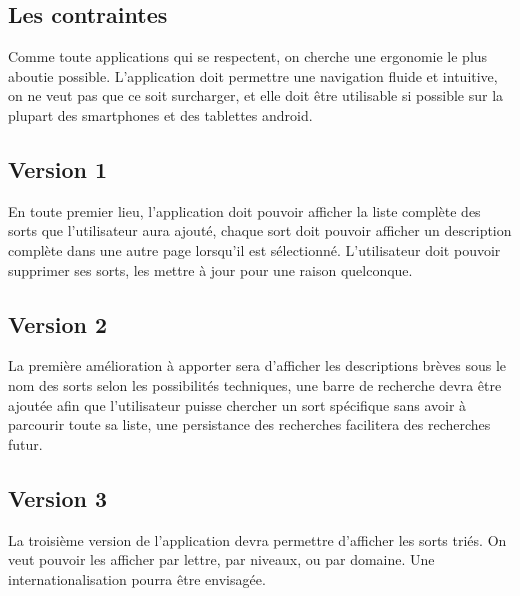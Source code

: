 \documentclass[a4paper, 11pt]{report}
\begin{document}
		\subsection{Les contraintes}
			Comme toute applications qui se respectent, on cherche une ergonomie le plus aboutie possible.
			L'application doit permettre une navigation fluide et intuitive, on ne veut pas que ce soit 
			surcharger, et elle doit être utilisable si possible sur la plupart des smartphones et des 
			tablettes android. 
			\subsection{Version 1}
				En toute premier lieu, l'application doit pouvoir afficher la liste complète des sorts
				que l'utilisateur aura ajouté, chaque sort doit pouvoir afficher un description complète
				dans une autre page lorsqu'il est sélectionné. L'utilisateur doit pouvoir supprimer ses 
				sorts, les mettre à jour pour une raison quelconque.  
			\subsection{Version 2}
				La première amélioration à apporter sera d'afficher les descriptions brèves sous le nom des 
				sorts selon les possibilités techniques, une barre de recherche devra être ajoutée afin 
				que l'utilisateur puisse chercher un sort spécifique sans avoir à parcourir toute sa liste,
				une persistance des recherches facilitera des recherches futur.
			\subsection{Version 3} 
				La troisième version de l'application devra permettre d'afficher les sorts triés.
				On veut pouvoir les afficher par lettre, par niveaux, ou par domaine. Une 
				internationalisation pourra être envisagée.

	
		
\end{document}
